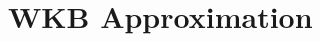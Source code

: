 \documentclass{aastex63}
\begin{document}
\section{WKB Approximation} \label{app:wkb}



\end{document}
